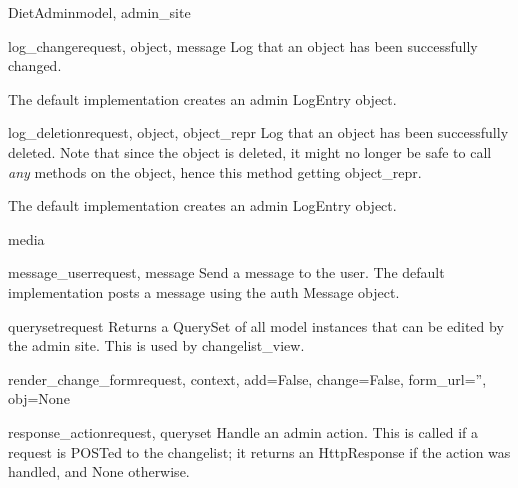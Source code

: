 \documentclass[letterpaper,10pt,english]{sphinxmanual}
\begin{document}
\begin{classdesc}{DietAdmin}{model, admin\_site}
\hypertarget{data.admin.DietAdmin.log_change}{}\begin{methoddesc}{log\_change}{request, object, message}
Log that an object has been successfully changed.

The default implementation creates an admin LogEntry object.
\end{methoddesc}

\hypertarget{data.admin.DietAdmin.log_deletion}{}\begin{methoddesc}{log\_deletion}{request, object, object\_repr}
Log that an object has been successfully deleted. Note that since the
object is deleted, it might no longer be safe to call \emph{any} methods
on the object, hence this method getting object\_repr.

The default implementation creates an admin LogEntry object.
\end{methoddesc}

\hypertarget{data.admin.DietAdmin.media}{}\begin{memberdesc}{media}\end{memberdesc}

\hypertarget{data.admin.DietAdmin.message_user}{}\begin{methoddesc}{message\_user}{request, message}
Send a message to the user. The default implementation
posts a message using the auth Message object.
\end{methoddesc}

\hypertarget{data.admin.DietAdmin.queryset}{}\begin{methoddesc}{queryset}{request}
Returns a QuerySet of all model instances that can be edited by the
admin site. This is used by changelist\_view.
\end{methoddesc}

\hypertarget{data.admin.DietAdmin.render_change_form}{}\begin{methoddesc}{render\_change\_form}{request, context, add=False, change=False, form\_url='', obj=None}\end{methoddesc}

\hypertarget{data.admin.DietAdmin.response_action}{}\begin{methoddesc}{response\_action}{request, queryset}
Handle an admin action. This is called if a request is POSTed to the
changelist; it returns an HttpResponse if the action was handled, and
None otherwise.
\end{methoddesc}


\end{classdesc}
\end{document}

